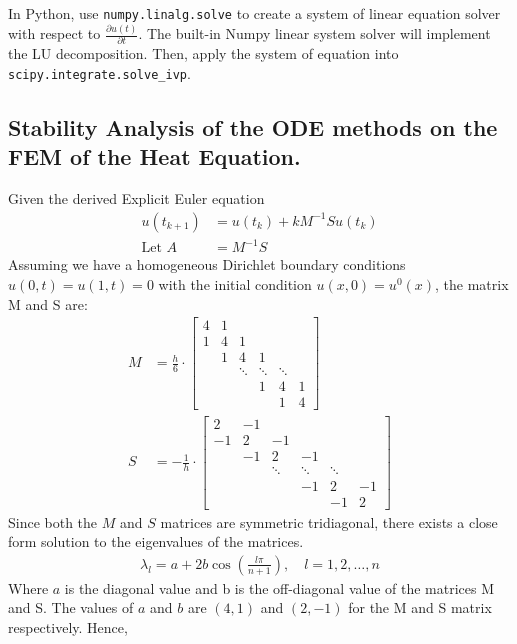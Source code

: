 \documentclass{article}
\begin{document}
In Python, use \texttt{numpy.linalg.solve} to create a system of linear equation solver with respect to $\frac{\partial u(t)}{\partial t}$. The built-in Numpy linear system solver will implement the LU decomposition. Then, apply the system of equation into \texttt{scipy.integrate.solve\_ivp}.


\subsection{Stability Analysis of the ODE methods on the FEM of the Heat Equation.}%
\label{sub:Stability Analysis of the ODE methods on the FEM of the Heat Equation.}
Given the derived Explicit Euler equation
\begin{align}
  u(t_{k+1}) &= u(t_k) + kM^{-1}S u(t_k) \\
  \text{Let } A &= M^{-1}S
\end{align}
Assuming we have a homogeneous Dirichlet boundary conditions $u(0, t) = u(1, t) = 0$ with the
initial condition $u(x,0) = u^0(x)$, the matrix M and S are:
\begin{align}
  M &= \frac{h}{6} \cdot \begin{bmatrix}
  4 & 1\\ 1 & 4 & 1 \\ & 1 & 4 & 1 \\ & & \ddots & \ddots & \ddots \\ & & & 1 & 4 & 1 \\
    & & & & 1 & 4
\end{bmatrix} \\
    S &= -\frac{1}{h} \cdot \begin{bmatrix}
  2 & -1\\ -1 & 2 & -1 \\ & -1 & 2 & -1 \\ & & \ddots & \ddots & \ddots \\ & & & -1 & 2 & -1 \\
    & & & & -1 & 2
\end{bmatrix} 
\end{align}
Since both the $M$ and $S$ matrices are symmetric tridiagonal, there exists a close form solution
to the eigenvalues of the matrices.
\begin{align}
\lambda_l = a + 2b \cos\left(\frac{l\pi}{n+1}\right), \quad l = 1, 2, \ldots, n 
\end{align}
Where $a$ is the diagonal value and b is the off-diagonal value of the matrices M and S. The
values of $a$ and $b$ are $(4, 1)$ and $(2, -1)$ for the M and S matrix respectively. Hence,
\end{document}
